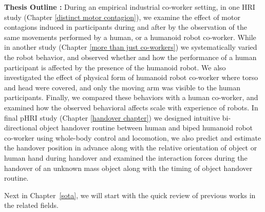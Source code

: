 \textbf{Thesis Outline :} During an empirical industrial co-worker setting, in one HRI study (Chapter \ref{distinct motor contagion}), we examine the effect of motor contagions induced in participants during and after by the observation of the same movements performed by a human, or a humanoid robot co-worker. While in  another study (Chapter \ref{more than just co-workers}) we systematically varied the robot behavior, and observed whether and how the performance of a human participant is affected by the presence of the humanoid robot. We also investigated the effect of physical form of humanoid robot co-worker where torso and head were covered, and only the moving arm was visible to the human participants. Finally, we compared these behaviors with a human co-worker, and examined how the observed behavioral affects scale with experience of robots. In final pHRI study (Chapter \ref{handover chapter}) we designed intuitive bi-directional object handover routine between human and biped humanoid robot co-worker using whole-body control and locomotion, we also predict and estimate the handover position in advance along with the relative orientation of object or human hand during handover and examined the interaction forces during the handover of an unknown mass object along with the timing of object handover routine.

Next in Chapter~\ref{sota}, we will start with the quick review of previous works in the related fields.



\clearpage %
\pagestyle{fancy}



